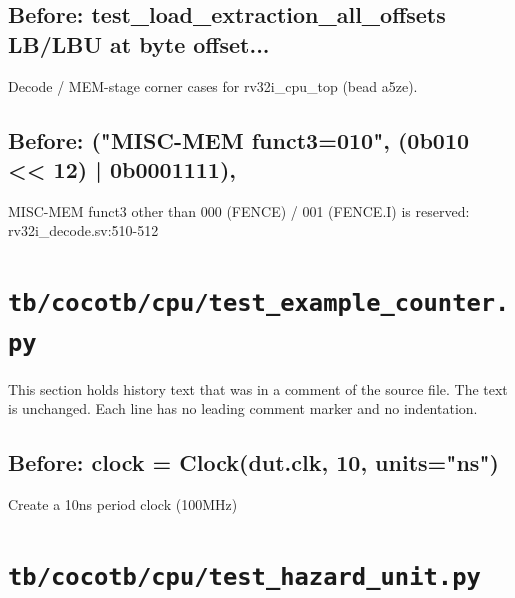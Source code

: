\begin{record}

\subsection*{Before: test\_load\_extraction\_all\_offsets   LB/LBU at byte offset...}

\begin{textblock}
Decode / MEM-stage corner cases for rv32i_cpu_top (bead a5ze).
\end{textblock}

\subsection*{Before: ("MISC-MEM funct3=010", (0b010 << 12) | 0b0001111),}

\begin{textblock}
MISC-MEM funct3 other than 000 (FENCE) / 001 (FENCE.I) is reserved: rv32i_decode.sv:510-512
\end{textblock}

\end{record}

\section{\texttt{tb/cocotb/cpu/test\_example\_counter.py}}\label{cr:suite:cpu-test-example-counter}

This section holds history text that was in a comment of the source file. The text is unchanged. Each line has no leading comment marker and no indentation.

\begin{record}

\subsection*{Before: clock = Clock(dut.clk, 10, units="ns")}

\begin{textblock}
Create a 10ns period clock (100MHz)
\end{textblock}

\end{record}

\section{\texttt{tb/cocotb/cpu/test\_hazard\_unit.py}}\label{cr:suite:cpu-test-hazard-unit}

